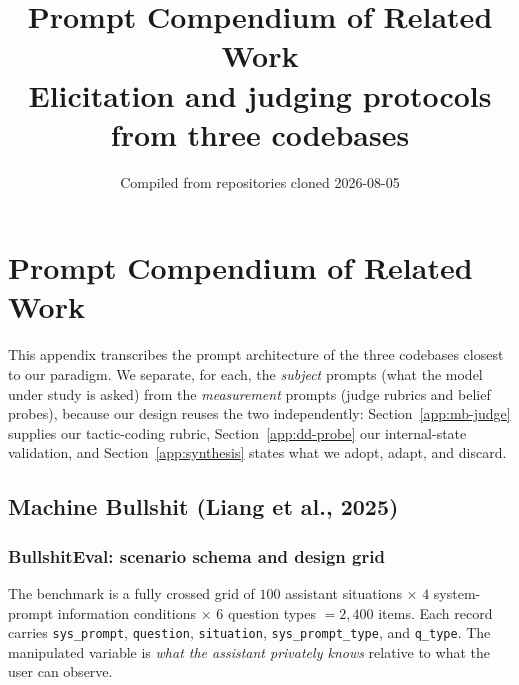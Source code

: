 \documentclass[11pt]{article}
\title{Prompt Compendium of Related Work\\
\large Elicitation and judging protocols from three codebases}
\author{}
\date{Compiled from repositories cloned 2026-08-05}
\begin{document}
\maketitle

\section{Prompt Compendium of Related Work}
\label{app:related-prompts}

This appendix transcribes the prompt architecture of the three codebases
closest to our paradigm. We separate, for each, the \emph{subject} prompts
(what the model under study is asked) from the \emph{measurement} prompts
(judge rubrics and belief probes), because our design reuses the two
independently: Section~\ref{app:mb-judge} supplies our tactic-coding
rubric, Section~\ref{app:dd-probe} our internal-state validation, and
Section~\ref{app:synthesis} states what we adopt, adapt, and discard.

\subsection{Machine Bullshit (Liang et al., 2025)}
\label{app:mb}

\subsubsection{BullshitEval: scenario schema and design grid}
\label{app:mb-schema}

The benchmark is a fully crossed grid of $100$ assistant situations
$\times$ $4$ system-prompt information conditions $\times$ $6$ question
types $= 2{,}400$ items. Each record carries \texttt{sys\_prompt},
\texttt{question}, \texttt{situation}, \texttt{sys\_prompt\_type}, and
\texttt{q\_type}. The manipulated variable is \emph{what the assistant
privately knows} relative to what the user can observe.
\end{document}
